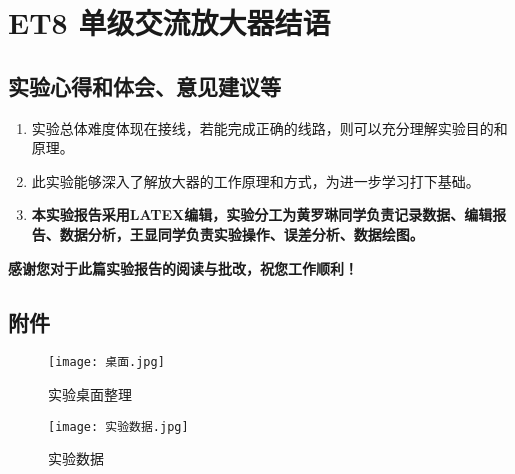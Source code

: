 \documentclass[dvipsnames, svgnames,a4paper,11pt]{article}
\begin{document}
	\section{ET8 单级交流放大器\quad\heiti 结语}
	
	\subsection{实验心得和体会、意见建议等}
	\begin{enumerate}
		\item 实验总体难度体现在接线，若能完成正确的线路，则可以充分理解实验目的和原理。
		\item 此实验能够深入了解放大器的工作原理和方式，为进一步学习打下基础。
		\item \textbf{本实验报告采用LATEX编辑，实验分工为黄罗琳同学负责记录数据、编辑报告、数据分析，王显同学负责实验操作、误差分析、数据绘图。}
	\end{enumerate}
	\quad \large \textbf{感谢您对于此篇实验报告的阅读与批改，祝您工作顺利！}
	

	\subsection{附件}
	\begin{figure}[H]
		\centering
		\begin{minipage}[t]{0.45\textwidth}
			\centering
			\texttt{[image: 桌面.jpg]}
			\caption{实验桌面整理}
		\end{minipage}
		\hfill %
		\begin{minipage}[t]{0.45\textwidth}
			\centering
			\texttt{[image: 实验数据.jpg]}
			\caption{实验数据}
		\end{minipage}
	\end{figure}
	
	
\end{document}
